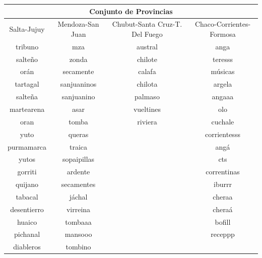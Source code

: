 \begin{table}
\centering
{%
\begin{tabular}{|c|c|c|c|}
\hline
\multicolumn{4}{|c|}{Conjunto de Provincias} \\ \hline
\hline
Salta-Jujuy & Mendoza-San Juan & Chubut-Santa Cruz-T. Del Fuego & Chaco-Corrientes-Formosa   \\ \hline
tribuno     & mza              & austral                        & anga                       \\
salteño     & zonda            & chilote                        & teresss                    \\
orán        & secamente        & calafa                         & músicas                    \\
tartagal    & sanjuaninos      & chilota                        & argela                     \\
salteña     & sanjuanino       & palmaso                        & angaaa                     \\
martearena  & asar             & vueltines                      & olo                        \\
oran        & tomba            & riviera                        & cuchale                    \\
yuto        & queras           &                                & corrientesss               \\
purmamarca  & traica           &                                & angá                       \\
yutos       & sopaipillas      &                                & cts                        \\
gorriti     & ardente          &                                & correntinas                \\
quijano     & secamentes       &                                & iburrr                     \\
tabacal     & jáchal           &                                & cheraa                     \\
desentierro & virreina         &                                & cheraá                     \\
huaico      & tombaaa          &                                & bofill                     \\
pichanal    & mansooo          &                                & receppp                    \\
diableros   & tombino          &                                &                            \\

\end{tabular}}
\end{table}
